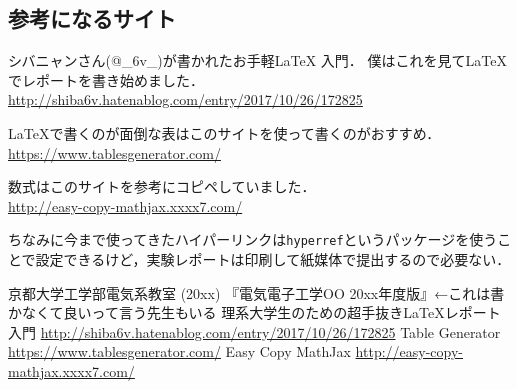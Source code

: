 \documentclass[autodetect-engine,dvipdfmx-if-dvi,ja=standard,a4paper,11pt,titlepage]{bxjsarticle}
\begin{document}
\subsection{参考になるサイト}
\label{sub:d_site}
シバニャンさん(@\_6v\_)が書かれたお手軽\LaTeX{} 入門\cite{_6v_}．
僕はこれを見て\LaTeX{} でレポートを書き始めました．\\
\url{http://shiba6v.hatenablog.com/entry/2017/10/26/172825}

\LaTeX{}で書くのが面倒な表はこのサイト\cite{tablegen}を使って書くのがおすすめ．\\
\url{https://www.tablesgenerator.com/}

数式はこのサイト\cite{mathjax}を参考にコピペしていました．\\
\url{http://easy-copy-mathjax.xxxx7.com/}

ちなみに今まで使ってきたハイパーリンクは\verb+hyperref+というパッケージを使うことで設定できるけど，実験レポートは印刷して紙媒体で提出するので必要ない．

\begin{thebibliography}{9}
 京都大学工学部電気系教室 (20xx) 『電気電子工学OO 20xx年度版』←これは書かなくて良いって言う先生もいる
 理系大学生のための超手抜きLaTeXレポート入門 \url{http://shiba6v.hatenablog.com/entry/2017/10/26/172825}
 Table Generator \url{https://www.tablesgenerator.com/}
 Easy Copy MathJax \url{http://easy-copy-mathjax.xxxx7.com/}
\end{thebibliography}
\end{document}
